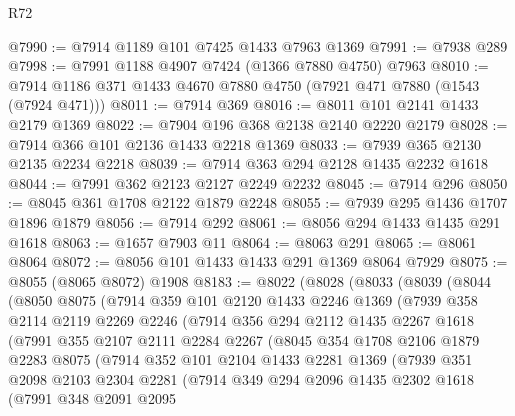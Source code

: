 \begin{lexlean}{R72}
\begin{coremodule}
@7990 := @7914 @1189 @101 @7425 @1433 @7963 @1369
@7991 := @7938 @289
@7998 := @7991 @1188 @4907 @7424 (@1366 @7880 @4750) @7963
@8010 := @7914 @1186 @371 @1433 @4670 @7880 @4750 (@7921 @471 @7880 (@1543 (@7924 @471)))
@8011 := @7914 @369
@8016 := @8011 @101 @2141 @1433 @2179 @1369
@8022 := @7904 @196 @368 @2138 @2140 @2220 @2179
@8028 := @7914 @366 @101 @2136 @1433 @2218 @1369
@8033 := @7939 @365 @2130 @2135 @2234 @2218
@8039 := @7914 @363 @294 @2128 @1435 @2232 @1618
@8044 := @7991 @362 @2123 @2127 @2249 @2232
@8045 := @7914 @296
@8050 := @8045 @361 @1708 @2122 @1879 @2248
@8055 := @7939 @295 @1436 @1707 @1896 @1879
@8056 := @7914 @292
@8061 := @8056 @294 @1433 @1435 @291 @1618
@8063 := @1657 @7903 @11
@8064 := @8063 @291
@8065 := @8061 @8064
@8072 := @8056 @101 @1433 @1433 @291 @1369 @8064 @7929
@8075 := @8055 (@8065 @8072) @1908
@8183 := @8022
    (@8028
      (@8033
        (@8039
          (@8044
            (@8050
              @8075
              (@7914
                @359
                @101
                @2120
                @1433
                @2246
                @1369
                (@7939
                  @358
                  @2114
                  @2119
                  @2269
                  @2246
                  (@7914
                    @356
                    @294
                    @2112
                    @1435
                    @2267
                    @1618
                    (@7991
                      @355
                      @2107
                      @2111
                      @2284
                      @2267
                      (@8045
                        @354
                        @1708
                        @2106
                        @1879
                        @2283
                        @8075
                        (@7914
                          @352
                          @101
                          @2104
                          @1433
                          @2281
                          @1369
                          (@7939
                            @351
                            @2098
                            @2103
                            @2304
                            @2281
                            (@7914
                              @349
                              @294
                              @2096
                              @1435
                              @2302
                              @1618
                              (@7991
                                @348
                                @2091
                                @2095

\end{coremodule}
\end{lexlean}
